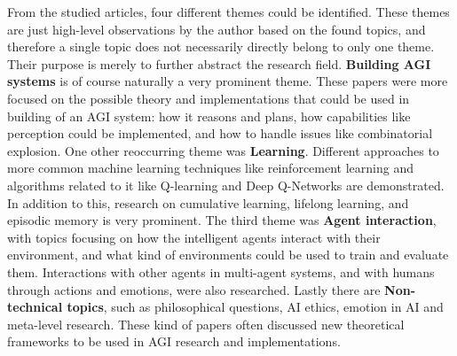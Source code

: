 From the studied articles, four different themes could be identified. These
themes are just high-level observations by the author based on the found topics,
and therefore a single topic does not necessarily directly belong to only one
theme. Their purpose is merely to further abstract the research field.
\textbf{Building AGI systems} is of course naturally a very prominent theme.
These papers were more focused on the possible theory and implementations that
could be used in building of an AGI system: how it reasons and plans, how
capabilities like perception could be implemented, and how to handle issues like
combinatorial explosion. One other reoccurring theme was \textbf{Learning}.
Different approaches to more common machine learning techniques like
reinforcement learning and algorithms related to it like Q-learning and Deep
Q-Networks are demonstrated. In addition to this, research on cumulative
learning, lifelong learning, and episodic memory is very prominent. The third
theme was \textbf{Agent interaction}, with topics focusing on how the
intelligent agents interact with their environment, and what kind of
environments could be used to train and evaluate them. Interactions with other
agents in multi-agent systems, and with humans through actions and emotions,
were also researched. Lastly there are \textbf{Non-technical topics}, such as
philosophical questions, AI ethics, emotion in AI and meta-level research. These
kind of papers often discussed new theoretical frameworks to be used in AGI
research and implementations. 

